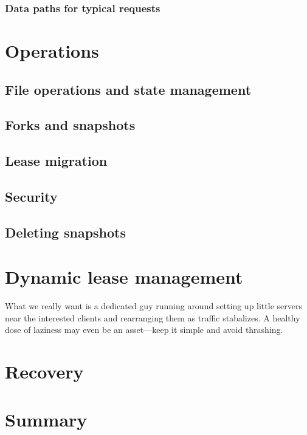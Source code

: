 \subsubsection{Data paths for typical requests}

\section{Operations}
\subsection{File operations and state management}
\subsection{Forks and snapshots}
\subsection{Lease migration}
\subsection{Security}
\subsection{Deleting snapshots}

\section{Dynamic lease management}

What we really want is a dedicated guy running around setting up little servers near the interested clients and rearranging them as traffic stabalizes. A healthy dose of laziness may even be an asset---keep it simple and avoid thrashing.

\section{Recovery}

\section{Summary}